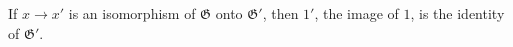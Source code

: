 If $x \to x'$ is an isomorphism of $\mathfrak{G}$ onto $\mathfrak{G}'$, then $1'$, the image of $1$, is the identity of $\mathfrak{G}'$.

